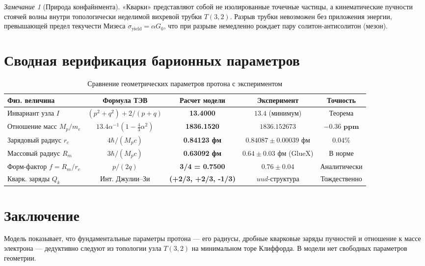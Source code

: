 \documentclass[11pt,a4paper]{article}
\theoremstyle{definition}
\theoremstyle{remark}
\newtheorem{remark}{Замечание}
\begin{document}
\begin{remark}[Природа конфайнмента]
«Кварки» представляют собой не изолированные точечные частицы, а кинематические пучности стоячей волны внутри топологически неделимой вихревой трубки $T(3,2)$. Разрыв трубки невозможен без приложения энергии, превышающей предел текучести Мизеса $\sigma_{\mathrm{yield}} = \alpha G_0$, что при разрыве немедленно рождает пару солитон-антисолитон (мезон).
\end{remark}

\section{Сводная верификация барионных параметров}

\begin{table}[h]
\centering
\small
\caption{Сравнение геометрических параметров протона с экспериментом}
\label{tab:proton_summary}
\vspace{2mm}
\begin{tabular}{lcccc}
\toprule
\textbf{Физ. величина} & \textbf{Формула ТЭВ} & \textbf{Расчет модели} & \textbf{Эксперимент} & \textbf{Точность} \\
\midrule
Инвариант узла $I$ & $(p^2+q^2) + 2/(p+q)$ & \textbf{13.4000} & $13.4$ (минимум) & Теорема \\
Отношение масс $M_p/m_e$ & $13.4 \alpha^{-1}(1 - \frac{4}{3}\alpha^2)$ & \textbf{1836.1520} & $1836.152673$ & $\mathbf{-0.36\text{ ppm}}$ \\
Зарядовый радиус $r_c$ & $4 \hbar / (M_p c)$ & \textbf{0.84123 фм} & $0.84087 \pm 0.00039$ фм & $0.04\%$ \\
Массовый радиус $R_m$ & $3 \hbar / (M_p c)$ & \textbf{0.63092 фм} & $0.64 \pm 0.03$ фм (GlueX) & В норме \\
Форм-фактор $f = R_m/r_c$ & $p / (2q)$ & \textbf{3/4 = 0.7500} & $0.76 \pm 0.04$ & Аналитически \\
Кварк. заряды $Q_k$ & Инт. Джулии--Зи & \textbf{(+2/3, +2/3, -1/3)} & $uud$-структура & Тождественно \\
\bottomrule
\end{tabular}
\end{table}

\section{Заключение}
Модель показывает, что фундаментальные параметры протона — его радиусы, дробные кварковые заряды пучностей и отношение к массе электрона — дедуктивно следуют из топологии узла $T(3,2)$ на минимальном торе Клиффорда. В модели нет свободных параметров геометрии.
\end{document}
